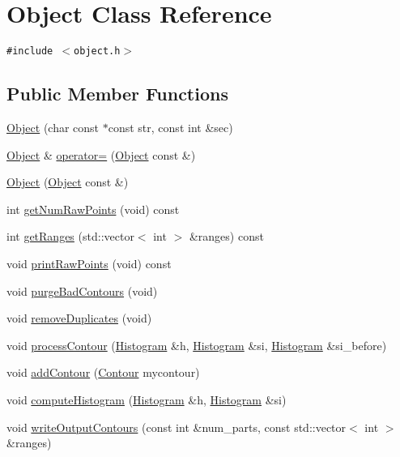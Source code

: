 \hypertarget{classObject}{
\section{Object Class Reference}
\label{classObject}
}
{\tt \#include $<$object.h$>$}

\subsection*{Public Member Functions}
\begin{CompactItemize}
\item 
\hyperlink{classObject_0cca670c8c001209999fe25b86db853e}{Object} (char const $\ast$const str, const int \&sec)
\item 
\hyperlink{classObject}{Object} \& \hyperlink{classObject_d5a622757f2d91f0b3fc41b8af751d6f}{operator=} (\hyperlink{classObject}{Object} const \&)
\item 
\hyperlink{classObject_6e166f85639b15a8b8f9b783a6de3b45}{Object} (\hyperlink{classObject}{Object} const \&)
\item 
int \hyperlink{classObject_6aaf101247a2ae13d5a1801e75184d7d}{getNumRawPoints} (void) const 
\item 
int \hyperlink{classObject_dcde331995062eec9ba70c6f88ef5086}{getRanges} (std::vector$<$ int $>$ \&ranges) const 
\item 
void \hyperlink{classObject_547991c3188f392ce00323b192142e98}{printRawPoints} (void) const 
\item 
void \hyperlink{classObject_2a840530103821a55da4c585c0aa1fb7}{purgeBadContours} (void)
\item 
void \hyperlink{classObject_3af0df50f0a3151df20fff62dcc1a891}{removeDuplicates} (void)
\item 
void \hyperlink{classObject_36ddffb901419facf6f32009a363405a}{processContour} (\hyperlink{classHistogram}{Histogram} \&h, \hyperlink{classHistogram}{Histogram} \&si, \hyperlink{classHistogram}{Histogram} \&si\_\-before)
\item 
void \hyperlink{classObject_0fbe7d79e1badad7bf63152cedb093bf}{addContour} (\hyperlink{classContour}{Contour} mycontour)
\item 
void \hyperlink{classObject_ec722906474791fe7ed7f738a5ae14b0}{computeHistogram} (\hyperlink{classHistogram}{Histogram} \&h, \hyperlink{classHistogram}{Histogram} \&si)
\item 
void \hyperlink{classObject_823588fd0be248ca9b7e1412d2d14931}{writeOutputContours} (const int \&num\_\-parts, const std::vector$<$ int $>$ \&ranges)

\end{CompactItemize}
